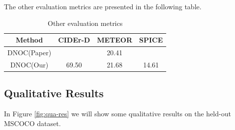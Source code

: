 \documentclass[a4paper, 11pt]{article} %
\begin{document}
The other evaluation metrics are presented in the following table.

\begin{table}[H]
	\begin{center}
		\begin{tabular}{c|ccc}
			\toprule
			Method      & CIDEr-D & METEOR & SPICE \\
			\midrule
			DNOC(Paper) &         & 20.41  &       \\
			DNOC(Our)   & 69.50   & 21.68  & 14.61 \\
			\bottomrule
		\end{tabular}
		\caption{Other evaluation metrics}
	\end{center}
\end{table}

\subsection{\textbf{Qualitative Results}}

In Figure \ref{fig:qua-res} we will show some qualitative results on the held-out MSCOCO
dataset.
\end{document}
